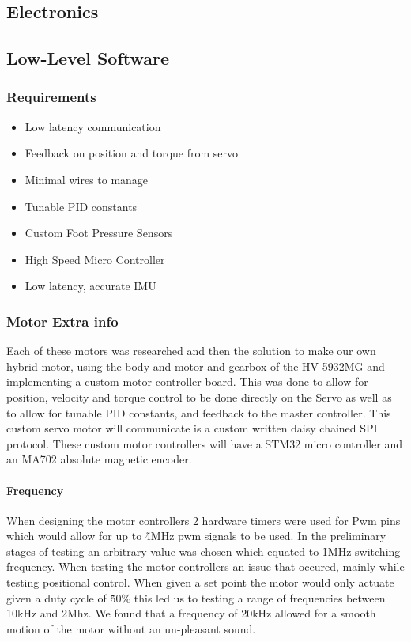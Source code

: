         
    
    \subsection{Electronics}


    \subsection{Low-Level Software}
    \subsubsection{Requirements}
    \begin{itemize} %
        \item Low latency communication
        \item Feedback on position and torque from servo
        \item Minimal wires to manage
        \item Tunable PID constants
        \item Custom Foot Pressure Sensors
        \item High Speed Micro Controller
        \item Low latency, accurate IMU
    \end{itemize}

\subsubsection{Motor Extra info}
 Each of these motors was researched and then the solution to make our own hybrid motor, using the body and motor and gearbox of the HV-5932MG and implementing a custom motor controller board. This was done to allow for position, velocity and torque control to be done directly on the Servo as well as to allow for tunable PID constants, and feedback to the master controller. This custom servo motor will communicate is a custom written daisy chained SPI protocol. These custom motor controllers will have a STM32 micro controller and an MA702 absolute magnetic encoder\cite{MA702}.
\paragraph{Frequency}
When designing the motor controllers 2 hardware timers were used for Pwm pins which would allow for up to \~4MHz pwm signals to be used. In the preliminary stages of testing an arbitrary value was chosen which equated to \~1MHz switching frequency. When testing the motor controllers an issue that occured, mainly while testing positional control. When given a set point the motor would only actuate given a duty cycle of  \~50\% this led us to testing a range of frequencies between 10kHz and 2Mhz. We found that a frequency of 20kHz allowed for a smooth motion of the motor without an un-pleasant sound.  
